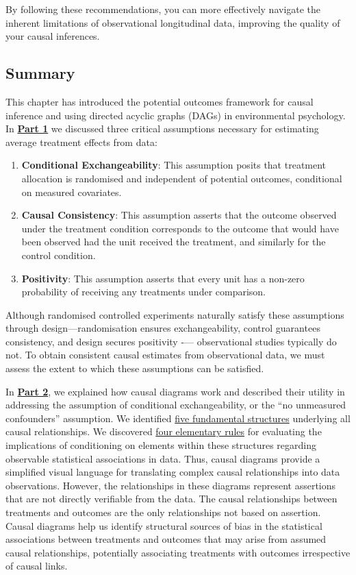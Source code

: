 \documentclass[
  singlecolumn]{article}
\providecommand{\tightlist}{%
  \setlength{\itemsep}{0pt}\setlength{\parskip}{0pt}}\usepackage{longtable,booktabs,array}
\begin{document}
By following these recommendations, you can more effectively navigate
the inherent limitations of observational longitudinal data, improving
the quality of your causal inferences.

\subsection{Summary}\label{summary}

This chapter has introduced the potential outcomes framework for causal
inference and using directed acyclic graphs (DAGs) in environmental
psychology. In \hyperref[section-part1]{\textbf{Part 1}} we discussed
three critical assumptions necessary for estimating average treatment
effects from data:

\begin{enumerate}
\def\labelenumi{\arabic{enumi}.}
\tightlist
\item
  \textbf{Conditional Exchangeability}: This assumption posits that
  treatment allocation is randomised and independent of potential
  outcomes, conditional on measured covariates.
\item
  \textbf{Causal Consistency}: This assumption asserts that the outcome
  observed under the treatment condition corresponds to the outcome that
  would have been observed had the unit received the treatment, and
  similarly for the control condition.
\item
  \textbf{Positivity}: This assumption asserts that every unit has a
  non-zero probability of receiving any treatments under comparison.
\end{enumerate}

Although randomised controlled experiments naturally satisfy these
assumptions through design---randomisation ensures exchangeability,
control guarantees consistency, and design secures positivity -\/---
observational studies typically do not. To obtain consistent causal
estimates from observational data, we must assess the extent to which
these assumptions can be satisfied.

In \hyperref[sec-part2]{\textbf{Part 2}}, we explained how causal
diagrams work and described their utility in addressing the assumption
of conditional exchangeability, or the ``no unmeasured confounders''
assumption. We identified \hyperref[sec-five-elementary]{five
fundamental structures} underlying all causal relationships. We
discovered \hyperref[sec-four-rules]{four elementary rules} for
evaluating the implications of conditioning on elements within these
structures regarding observable statistical associations in data. Thus,
causal diagrams provide a simplified visual language for translating
complex causal relationships into data observations. However, the
relationships in these diagrams represent assertions that are not
directly verifiable from the data. The causal relationships between
treatments and outcomes are the only relationships not based on
assertion. Causal diagrams help us identify structural sources of bias
in the statistical associations between treatments and outcomes that may
arise from assumed causal relationships, potentially associating
treatments with outcomes irrespective of causal links.
\end{document}
